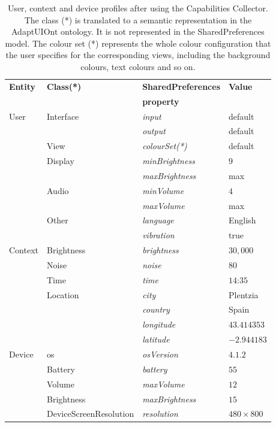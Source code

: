 \begin{itemize}
\begin{itemize}
\begin{table}
 \caption{User, context and device profiles after using the Capabilities Collector.
 The class (*) is translated to a semantic representation in the AdaptUIOnt ontology.
 It is not represented in the SharedPreferences model. The colour set (*) represents
 the whole colour configuration that the user specifies for the corresponding
 views, including the background colours, text colours and so on.}
 \label{tbl:profiles}
 \footnotesize
 \centering
\begin{tabular}{l l l l}
  \hline 
  \textbf{Entity}& \textbf{Class(*)}& \textbf{SharedPreferences} & \textbf{Value}\\
		& 		& \textbf{property} 		& \\
  \hline
  User 		& Interface 	& \textit{input}		& default	\\
		& 		& \textit{output} 		& default	\\
		& View		& \textit{colourSet(*)}		& default	\\
		& Display 	& \textit{minBrightness}	& $9$		\\ 
		& 		& \textit{maxBrightness}	& max		\\
		& Audio 	& \textit{minVolume}		& $4$		\\
		& 		& \textit{maxVolume} 		& max		\\
		& Other 	& \textit{language}		& English	\\
		& 		& \textit{vibration} 		& true 		\\
		
  Context	& Brightness	& \textit{brightness}		& $30,000$	\\
		& Noise		& \textit{noise}		& $80$		\\
		& Time		& \textit{time}			& $14$:$35$	\\
		& Location	& \textit{city}			& Plentzia	\\
		&		& \textit{country}		& Spain		\\
		&		& \textit{longitude}		& $43.414353$	\\
		&		& \textit{latitude} 		& $-2.944183$	\\
  Device	& \ac{os}	& \textit{osVersion}		& $4.1.2$	\\
		& Battery	& \textit{battery}		& $55$		\\
		& Volume	& \textit{maxVolume}		& $12$		\\
		& Brightness	& \textit{maxBrightness}	& $15$		\\
		& DeviceScreenResolution & \textit{resolution}	& $480×800$	\\	
  \hline
\end{tabular}
\end{table}


\end{itemize}
\end{itemize}
